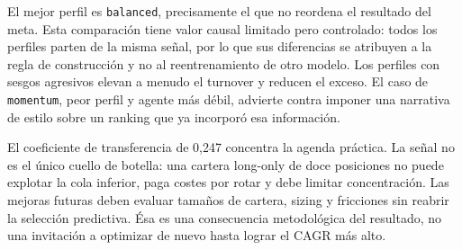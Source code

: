 El mejor perfil es \texttt{balanced}, precisamente el que no reordena el resultado del meta. Esta
comparación tiene valor causal limitado pero controlado: todos los perfiles parten de la misma señal,
por lo que sus diferencias se atribuyen a la regla de construcción y no al reentrenamiento de otro
modelo. Los perfiles con sesgos agresivos elevan a menudo el turnover y reducen el exceso. El caso
de \texttt{momentum}, peor perfil y agente más débil, advierte contra imponer una narrativa de estilo
sobre un ranking que ya incorporó esa información.

El coeficiente de transferencia de 0,247 concentra la agenda práctica. La señal no es el único
cuello de botella: una cartera long-only de doce posiciones no puede explotar la cola inferior, paga
costes por rotar y debe limitar concentración. Las mejoras futuras deben evaluar tamaños de cartera,
sizing y fricciones sin reabrir la selección predictiva. Ésa es una consecuencia metodológica del
resultado, no una invitación a optimizar de nuevo hasta lograr el CAGR más alto.
